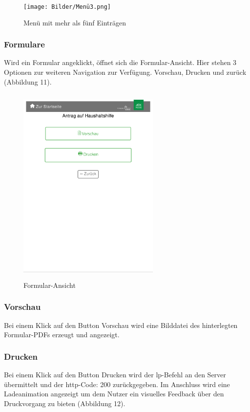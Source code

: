 \begin{figure}[htp]
    \centering
    \texttt{[image: Bilder/Menü3.png]}
    \caption[Startseite des Self-Service-Terminals]{Menü mit mehr als fünf Einträgen}
    \label{fig:SSTMenüPagination}
\end{figure}

\newpage

\subsubsection{Formulare}Wird ein Formular angeklickt, öffnet sich die Formular-Ansicht. Hier stehen 3 Optionen zur weiteren Navigation zur Verfügung. \glqq Vorschau\grqq{}, \glqq Drucken\grqq{} und \glqq zurück\grqq{} (Abbildung 11).

\begin{figure}[htp]
    \centering
    \includegraphics[width=7cm , height=10cm]{Bilder/Formular1.png}
    \caption[Startseite des Self-Service-Terminals]{Formular-Ansicht}
    \label{fig:SSTFormular}
\end{figure}

\subsubsection{Vorschau} Bei einem Klick auf den Button \glqq Vorschau\grqq{} wird eine Bilddatei des hinterlegten Formular-PDFs erzeugt und angezeigt.

\newpage

\subsubsection{Drucken} Bei einem Klick auf den Button \glqq Drucken\grqq{} wird der lp-Befehl an den Server übermittelt und der http-Code: 200 zurückgegeben. Im Anschluss wird eine Ladeanimation angezeigt um dem Nutzer ein visuelles Feedback über den Druckvorgang zu bieten (Abbildung 12).

